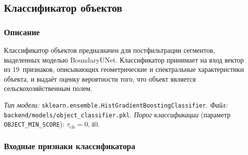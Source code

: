 \documentclass[14pt,a4paper]{extarticle}
\newcommand{\tbl}[1]{\texttt{#1}}  %
\newcommand{\env}[1]{\texttt{#1}}  %
\begin{document}
\subsection{Классификатор объектов}

\subsubsection{Описание}

Классификатор объектов предназначен для постфильтрации сегментов,
выделенных моделью BoundaryUNet. Классификатор принимает на вход вектор
из 19~признаков, описывающих геометрические и спектральные характеристики
объекта, и выдаёт оценку вероятности того, что объект является
сельскохозяйственным полем.

\textit{Тип модели:} \tbl{sklearn.ensemble.HistGradientBoostingClassifier}.
\textit{Файл:} \tbl{backend/models/object\_classifier.pkl}.
\textit{Порог классификации} (параметр \env{OBJECT\_MIN\_SCORE}):
$\tau_{\text{cls}} = 0{,}40$.

\subsubsection{Входные признаки классификатора}
\end{document}
